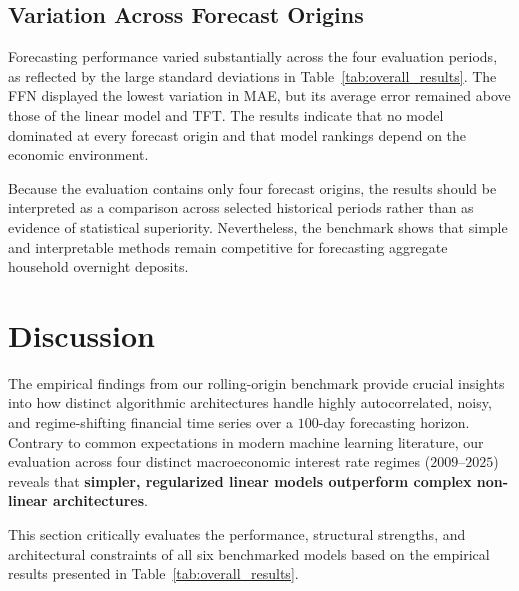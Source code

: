 \documentclass[11pt,a4paper]{article}
\begin{document}
\subsection{Variation Across Forecast Origins}

Forecasting performance varied substantially across the four evaluation
periods, as reflected by the large standard deviations in
Table~\ref{tab:overall_results}. The FFN displayed the lowest variation in
MAE, but its average error remained above those of the linear model and TFT.
The results indicate that no model dominated at every forecast origin and that
model rankings depend on the economic environment.

Because the evaluation contains only four forecast origins, the results should
be interpreted as a comparison across selected historical periods rather than
as evidence of statistical superiority. Nevertheless, the benchmark shows
that simple and interpretable methods remain competitive for forecasting
aggregate household overnight deposits.
\section{Discussion}
\label{sec:discussion}

The empirical findings from our rolling-origin benchmark provide crucial insights into how distinct algorithmic architectures handle highly autocorrelated, noisy, and regime-shifting financial time series over a $100$-day forecasting horizon. Contrary to common expectations in modern machine learning literature, our evaluation across four distinct macroeconomic interest rate regimes ($2009$--$2025$) reveals that \textbf{simpler, regularized linear models outperform complex non-linear architectures}.

This section critically evaluates the performance, structural strengths, and architectural constraints of all six benchmarked models based on the empirical results presented in Table~\ref{tab:overall_results}.
\end{document}
